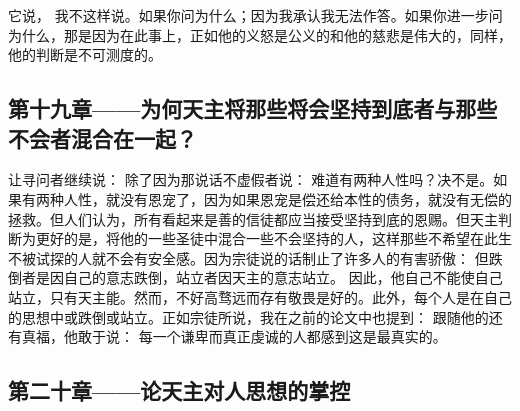 它说， 我不这样说。如果你问为什么；因为我承认我无法作答。如果你进一步问为什么，那是因为在此事上，正如他的义怒是公义的和他的慈悲是伟大的，同样，他的判断是不可测度的。\par


\subsection{第十九章——为何天主将那些将会坚持到底者与那些不会者混合在一起？}

让寻问者继续说： 除了因为那说话不虚假者说： 难道有两种人性吗？决不是。如果有两种人性，就没有恩宠了，因为如果恩宠是偿还给本性的债务，就没有无偿的拯救。但人们认为，所有看起来是善的信徒都应当接受坚持到底的恩赐。但天主判断为更好的是，将他的一些圣徒中混合一些不会坚持的人，这样那些不希望在此生不被试探的人就不会有安全感。因为宗徒说的话制止了许多人的有害骄傲： 但跌倒者是因自己的意志跌倒，站立者因天主的意志站立。 因此，他自己不能使自己站立，只有天主能。然而，不好高骛远而存有敬畏是好的。此外，每个人是在自己的思想中或跌倒或站立。正如宗徒所说，我在之前的论文中也提到： 跟随他的还有真福，他敢于说： 每一个谦卑而真正虔诚的人都感到这是最真实的。\par


\subsection{第二十章——论天主对人思想的掌控}


